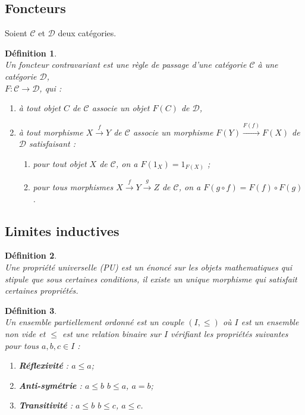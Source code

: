 \documentclass[a4paper, 14pt]{report}
\newtheorem{definition}{Définition}[section]
\begin{document}
\begin{onehalfspace}
{			\subsection{Foncteurs}
			Soient $\mathcal{C}$ et $\mathcal{D}$ deux catégories.
			\begin{definition} \cite{maclane1971categories} \\
				Un \textit{foncteur contravariant} est une règle de passage d'une catégorie $\mathcal{C}$ à une catégorie $\mathcal{D}$, \\
				$F : \mathcal{C} \to \mathcal{D}$, qui :
				\begin{enumerate} [label=\roman*)]
					\item à tout objet $C$ de $\mathcal{C}$ associe un objet $F(C)$ de $\mathcal{D}$,
					\item à tout morphisme $X \xrightarrow{f} Y$ de $\mathcal{C}$ associe un morphisme $F(Y) \xrightarrow{F(f)} F(X)$ de $\mathcal{D}$ satisfaisant :
					\begin{enumerate}
						\item pour tout objet $X$ de $\mathcal{C}$, on a $F(1_X) = 1_{F(X)}$ ;
						\item pour tous morphismes $X \xrightarrow{f} Y \xrightarrow{g} Z$ de $\mathcal{C}$, on a $F(g \circ f) = F(f) \circ F(g)$.
					\end{enumerate}
				\end{enumerate}
			\end{definition}
			
			
			
			\subsection{ Limites inductives}
			
			\begin{definition} \cite {maclane1971categories}\\
Une propriété universelle (PU) est un énoncé sur les objets mathematiques qui stipule que sous certaines conditions, il existe un unique morphisme qui satisfait certaines propriétés.
			\end{definition}
			
			\begin{definition} \cite{ribes-zalesskii} \\
				Un ensemble partiellement ordonné est un couple \((I, \leq)\) où \(I\) est un ensemble non vide et \(\leq\) est une relation binaire sur \(I\) vérifiant les propriétés suivantes pour tous \(a, b, c \in I\) :
				\begin{enumerate}[label=\roman*)]
					\item \textbf{Réflexivité} : \(a \leq a\);
					\item \textbf{Anti-symétrie} :  \(a \leq b\)  \(b \leq a\),  \(a = b\);
					\item \textbf{Transitivité} :  \(a \leq b\)  \(b \leq c\),  \(a \leq c\).
				\end{enumerate}
			\end{definition}
			
}
\end{onehalfspace}
\end{document}
